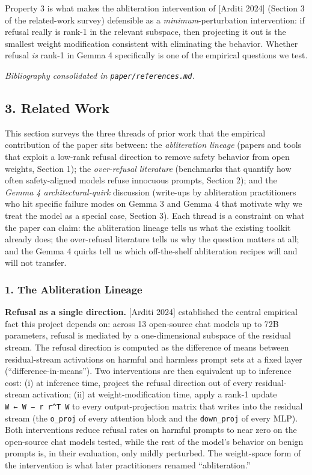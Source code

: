 \documentclass[
  11pt,
]{article}
\begin{document}
Property 3 is what makes the abliteration intervention of {[}Arditi
2024{]} (Section 3 of the related-work survey) defensible as a
\emph{minimum}-perturbation intervention: if refusal really is rank-1 in
the relevant subspace, then projecting it out is the smallest weight
modification consistent with eliminating the behavior. Whether refusal
\emph{is} rank-1 in Gemma 4 specifically is one of the empirical
questions we test.

\emph{Bibliography consolidated in \texttt{paper/references.md}.}

\subsection{3. Related Work}\label{related-work}

This section surveys the three threads of prior work that the empirical
contribution of the paper sits between: the \emph{abliteration lineage}
(papers and tools that exploit a low-rank refusal direction to remove
safety behavior from open weights, Section 1); the \emph{over-refusal
literature} (benchmarks that quantify how often safety-aligned models
refuse innocuous prompts, Section 2); and the \emph{Gemma 4
architectural-quirk} discussion (write-ups by abliteration practitioners
who hit specific failure modes on Gemma 3 and Gemma 4 that motivate why
we treat the model as a special case, Section 3). Each thread is a
constraint on what the paper can claim: the abliteration lineage tells
us what the existing toolkit already does; the over-refusal literature
tells us why the question matters at all; and the Gemma 4 quirks tell us
which off-the-shelf abliteration recipes will and will not transfer.

\subsubsection{1. The Abliteration
Lineage}\label{the-abliteration-lineage}

\textbf{Refusal as a single direction.} {[}Arditi 2024{]} established
the central empirical fact this project depends on: across 13
open-source chat models up to 72B parameters, refusal is mediated by a
one-dimensional subspace of the residual stream. The refusal direction
is computed as the difference of means between residual-stream
activations on harmful and harmless prompt sets at a fixed layer
(``difference-in-means''). Two interventions are then equivalent up to
inference cost: (i) at inference time, project the refusal direction out
of every residual-stream activation; (ii) at weight-modification time,
apply a rank-1 update \texttt{W\ ←\ W\ −\ r\ r\^{}T\ W} to every
output-projection matrix that writes into the residual stream (the
\texttt{o\_proj} of every attention block and the \texttt{down\_proj} of
every MLP). Both interventions reduce refusal rates on harmful prompts
to near zero on the open-source chat models tested, while the rest of
the model's behavior on benign prompts is, in their evaluation, only
mildly perturbed. The weight-space form of the intervention is what
later practitioners renamed ``abliteration.''
\end{document}
